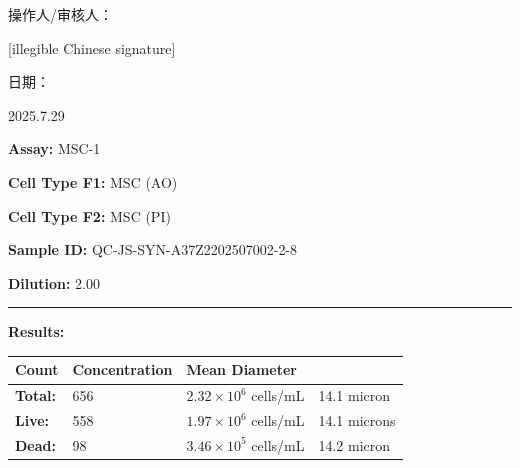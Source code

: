 \documentclass[UTF8,10pt,a4paper,fontset=fandol]{ctexart}
\newcommand{\fieldvalue}[1]{#1}
\newcommand{\handwritten}[1]{#1}
\begin{document}
\begin{center}
\begin{center}
\vfill

操作人/审核人：

\fieldvalue{\handwritten{[illegible Chinese signature]}}

\medskip
日期：

\fieldvalue{\handwritten{2025.7.29}}

\newpage

\noindent
\textbf{Assay:} \fieldvalue{MSC-1}

\noindent
\textbf{Cell Type F1:} \fieldvalue{MSC (AO)}

\noindent
\textbf{Cell Type F2:} \fieldvalue{MSC (PI)}

\noindent
\textbf{Sample ID:} \fieldvalue{QC-JS-SYN-A37Z2202507002-2-8}

\noindent
\textbf{Dilution:} \fieldvalue{2.00}

\bigskip
\noindent\rule{\textwidth}{0.4pt}

\noindent\textbf{Results:}

\medskip
\small
\begin{tabularx}{\textwidth}{@{}>{\RaggedRight\arraybackslash}X
>{\RaggedRight\arraybackslash}X
>{\RaggedRight\arraybackslash}X@{}}
\textbf{Count} & \textbf{Concentration} & \textbf{Mean Diameter} \\[2pt]
\hline
\textbf{Total:} &
\fieldvalue{656} &
\fieldvalue{$2.32 \times 10^{6}$ cells/mL}
&
\fieldvalue{14.1 micron}
\\[4pt]
\textbf{Live:} &
\fieldvalue{558} &
\fieldvalue{$1.97 \times 10^{6}$ cells/mL}
&
\fieldvalue{14.1 microns}
\\[4pt]
\textbf{Dead:} &
\fieldvalue{98} &
\fieldvalue{$3.46 \times 10^{5}$ cells/mL}
&
\fieldvalue{14.2 micron}
\end{tabularx}


\end{center}
\end{center}
\end{document}
